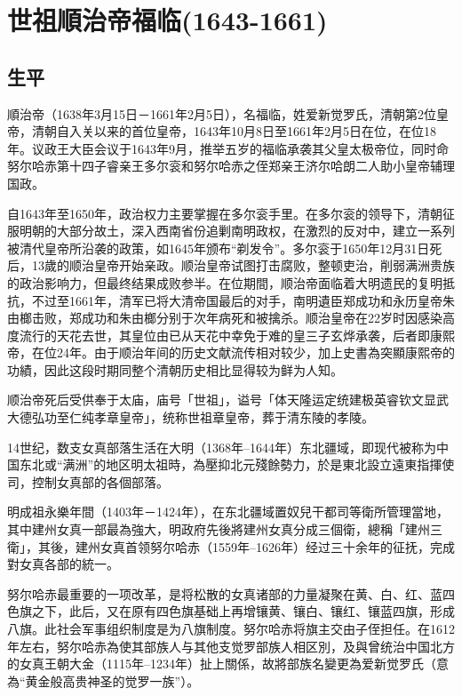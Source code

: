 
\section{世祖順治帝福临\tiny(1643-1661)}

\subsection{生平}

順治帝（1638年3月15日－1661年2月5日），名福临，姓爱新觉罗氏，清朝第2位皇帝，清朝自入关以来的首位皇帝，1643年10月8日至1661年2月5日在位，在位18年。议政王大臣会议于1643年9月，推举五岁的福临承袭其父皇太极帝位，同时命努尔哈赤第十四子睿亲王多尔衮和努尔哈赤之侄郑亲王济尔哈朗二人助小皇帝辅理国政。

自1643年至1650年，政治权力主要掌握在多尔衮手里。在多尔衮的领导下，清朝征服明朝的大部分故土，深入西南省份追剿南明政权，在激烈的反对中，建立一系列被清代皇帝所沿袭的政策，如1645年颁布“剃发令”。多尔衮于1650年12月31日死后，13歲的顺治皇帝开始亲政。顺治皇帝试图打击腐败，整顿吏治，削弱满洲贵族的政治影响力，但最终结果成败参半。在位期間，顺治帝面临着大明遗民的复明抵抗，不过至1661年，清军已将大清帝国最后的对手，南明遺臣郑成功和永历皇帝朱由榔击败，郑成功和朱由榔分别于次年病死和被擒杀。顺治皇帝在22岁时因感染高度流行的天花去世，其皇位由已从天花中幸免于难的皇三子玄烨承袭，后者即康熙帝，在位24年。由于顺治年间的历史文献流传相对较少，加上史書為突顯康熙帝的功績，因此这段时期同整个清朝历史相比显得较为鲜为人知。

顺治帝死后受供奉于太庙，庙号「世祖」，谥号「体天隆运定统建极英睿钦文显武大德弘功至仁纯孝章皇帝」，统称世祖章皇帝，葬于清东陵的孝陵。


14世纪，数支女真部落生活在大明（1368年–1644年）东北疆域，即现代被称为中国东北或“满洲”的地区明太祖時，為壓抑北元殘餘勢力，於是東北設立遠東指揮使司，控制女真部的各個部落。

明成祖永樂年間（1403年－1424年），在东北疆域置奴兒干都司等衛所管理當地，其中建州女真一部最為強大，明政府先後將建州女真分成三個衛，總稱「建州三衛」，其後，建州女真首领努尔哈赤（1559年–1626年）经过三十余年的征抚，完成對女真各部的統一。

努尔哈赤最重要的一项改革，是将松散的女真诸部的力量凝聚在黄、白、红、蓝四色旗之下，此后，又在原有四色旗基础上再增镶黄、镶白、镶红、镶蓝四旗，形成八旗。此社会军事组织制度是为八旗制度。努尔哈赤将旗主交由子侄担任。在1612年左右，努尔哈赤為使其部族人与其他支觉罗部族人相区別，及與曾统治中国北方的女真王朝大金（1115年–1234年）扯上關係，故將部族名變更為爱新觉罗氏（意為“黄金般高贵神圣的觉罗一族”）。

